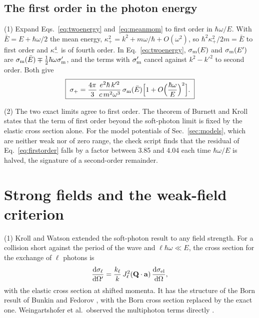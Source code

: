 \documentclass[11pt]{article}
\numberwithin{equation}{section}
\newcommand{\Qv}{\mathbf Q}
\newcommand{\av}{\mathbf a}
\newcommand{\dd}{\mathrm d}
\newcommand{\sm}{\sigma_{\rm m}}
\newcommand{\Ebar}{\bar E}
\begin{document}
\subsection{The first order in the photon energy}
\label{sec:firstorder}
{\noindent}(1) Expand Eqs.~\eqref{eq:twoenergy} and~\eqref{eq:meanmom} to
first order in $\hbar\omega/E$. With $\Ebar=E+\hbar\omega/2$ the mean energy,
$\kappa_+^2=k^2+m\omega/\hbar+O(\omega^2)$, so $\hbar^2\kappa_+^2/2m=\Ebar$ to
first order and $\kappa_-^4$ is of fourth order. In
Eq.~\eqref{eq:twoenergy}, $\sm(E)$ and $\sm(E')$ are $\sm(\Ebar)\mp\frac12\hbar\omega\sm'$,
and the terms with $\sm'$ cancel against $k^2-k'^2$ to second order. Both
give
\begin{equation}
\boxed{\;\sigma_+=\frac{4\pi}{3}\,\frac{e^2\hbar\,k'^2}{c\,m^2\omega^3}\,
\sm(\Ebar)\Big[1+O\Big(\frac{\hbar\omega}{E}\Big)^2\Big].\;}
\label{eq:firstorder}
\end{equation}

{\noindent}(2) The two exact limits agree to first order. The theorem of
Burnett and Kroll \cite{BurnettKroll1968} states that the term of first order
beyond the soft-photon limit is fixed by the elastic cross section alone. For
the model potentials of Sec.~\ref{sec:models}, which are neither weak nor of
zero range, the check script finds that the residual of
Eq.~\eqref{eq:firstorder} falls by a factor between 3.85 and 4.04 each time
$\hbar\omega/E$ is halved, the signature of a second-order remainder.

\section{Strong fields and the weak-field criterion}
\label{sec:strong}

{\noindent}(1) Kroll and Watson \cite{KrollWatson1973} extended the soft-photon
result to any field strength. For a collision short against the period of the
wave and $\ell\hbar\omega\ll E$, the cross section for the exchange of $\ell$
photons is
\begin{equation}
\frac{\dd\sigma_\ell}{\dd\Omega'}=\frac{k_\ell}{k}\,J_\ell^2(\Qv\cdot\av)\,
\frac{\dd\sigma_{\rm el}}{\dd\Omega},
\label{eq:kw}
\end{equation}
with the elastic cross section at shifted momenta. It has the structure of
the Born result of Bunkin and Fedorov \cite{BunkinFedorov1966}, with the
Born cross section replaced by the exact one. Weingartshofer et al.\ observed
the multiphoton terms directly \cite{Weingartshofer1977}.
\end{document}
